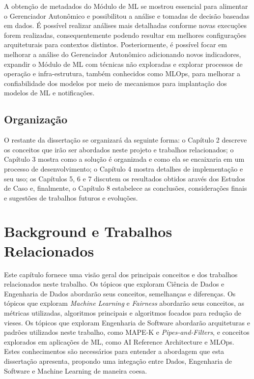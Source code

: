 \documentclass[portugues]{ic-tese}
\begin{document}
A obtenção de metadados do Módulo de ML se mostrou essencial para alimentar o Gerenciador Autonômico e possibilitou a análise e tomadas de decisão baseadas em dados. É possível realizar análises mais detalhadas conforme novas execuções forem realizadas, consequentemente podendo resultar em melhores configurações arquiteturais para contextos distintos. Posteriormente, é possível focar em melhorar a análise do Gerenciador Autonômico adicionando novos indicadores, expandir o Módulo de ML com técnicas não exploradas e explorar processos de operação e infra-estrutura, também conhecidos como MLOps, para melhorar a confiabilidade dos modelos por meio de mecanismos para implantação dos modelos de ML e notificações.

\section{Organização}

O restante da dissertação se organizará da seguinte forma: o Capítulo 2 descreve os conceitos que irão ser abordados neste projeto e trabalhos relacionados; o Capítulo 3 mostra como a solução é organizada e como ela se encaixaria em um processo de desenvolvimento; o Capítulo 4 mostra detalhes de implementação e seu uso; os Capítulos 5, 6 e 7 discutem os resultados obtidos aravés dos Estudos de Caso e, finalmente, o Capítulo 8 estabelece as conclusões, considerações finais e sugestões de trabalhos futuros e evoluções.

\chapter{Background e Trabalhos Relacionados}

Este capítulo fornece uma visão geral dos principais conceitos e dos trabalhos relacionados neste trabalho. Os tópicos que exploram Ciência de Dados e Engenharia de Dados abordarão seus conceitos, semelhanças e diferenças. Os tópicos que exploram \textit{Machine Learning} e \textit{Fairness} abordarão seus conceitos, as métricas utilizadas, algoritmos principais e algoritmos focados para redução de vieses. Os tópicos que exploram Engenharia de Software abordarão arquiteturas e padrões utilizados neste trabalho, como MAPE-K e \textit{Pipes-and-Filters}, e conceitos explorados em aplicações de ML, como AI Reference Architecture e MLOps. Estes conhecimentos são necessários para entender a abordagem que esta dissertação apresenta, propondo uma integação entre Dados, Engenharia de Software e Machine Learning de maneira coesa.
\end{document}
